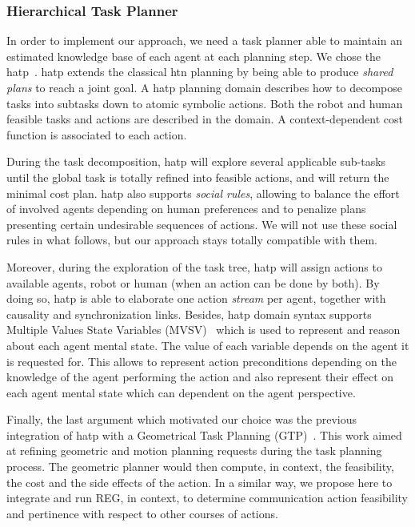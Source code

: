\documentclass[a4paper,11pt,twoside]{StyleThese}
\begin{document}
\subsubsection{Hierarchical Task Planner}

In order to implement our approach, we need a task planner able to maintain an estimated knowledge base of each agent at each planning step. We chose the \acrfull{hatp}~\cite{lallement2014hatp}. \acrshort{hatp} extends the classical \acrfull{htn} planning by being able to produce \textit{shared plans} to reach a joint goal. A \acrshort{hatp} planning domain describes how to decompose tasks into subtasks down to atomic symbolic actions. Both the robot and human feasible tasks and actions are described in the domain. A context-dependent cost function is associated to each action. 

During the task decomposition, \acrshort{hatp} will explore several applicable sub-tasks until the global task is totally refined into feasible actions, and will return the minimal cost plan. \acrshort{hatp} also supports \textit{social rules}, allowing to balance the effort of involved agents depending on human preferences and to penalize plans presenting certain undesirable sequences of actions. We will not use these social rules in what follows, but our approach stays totally compatible with them.

Moreover, during the exploration of the task tree, \acrshort{hatp} will assign actions to available agents, robot or human (when an action can be done by both). By doing so, \acrshort{hatp} is able to elaborate one action \textit{stream} per agent, together with causality and synchronization links. 
Besides, \acrshort{hatp} domain syntax supports Multiple Values State Variables (MVSV)~\cite{guitton2012belief} which is used to represent and reason about each agent mental state. The value of each variable depends on the agent it is requested for. This allows to represent action preconditions depending on the knowledge of the agent performing the action and also represent their effect on each agent mental state which can dependent on the agent perspective.

Finally, the last argument which motivated our choice was the previous integration of \acrshort{hatp}  with a  Geometrical Task Planning (GTP)~\cite{gharbi2015combining}. This work aimed at refining geometric and motion planning requests during the task planning process. The geometric planner would then compute, in context, the feasibility, the cost and the side effects of the action. In a similar way, we propose here to integrate and run REG, in context, to determine communication action feasibility and pertinence with respect to other courses of actions.
\end{document}
